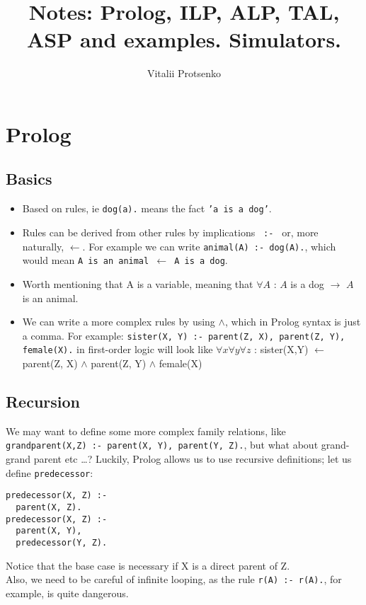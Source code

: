\documentclass[11pt]{article}
\begin{document}
\title{Notes: Prolog, ILP, ALP, TAL, ASP and examples. Simulators.}

\author{Vitalii Protsenko}

\date{}

\maketitle

\section{Prolog}

\subsection{Basics}

\begin{itemize}
  \item Based on rules, ie \texttt{dog(a).} means the fact \texttt{'a is a dog'}.
  \item Rules can be derived from other rules by implications \texttt{ :- } or, more naturally,  $\leftarrow$. For example we can write \texttt{animal(A) :- dog(A).}, which would mean \texttt{A is an animal $\leftarrow$ A is a dog}.
  \item Worth mentioning that A is a variable, meaning that $\forall A$ : $A$ is a dog $\rightarrow$ $A$ is an animal.
  \item We can write a more complex rules by using $\wedge$, which in Prolog syntax is just a comma. For example: \texttt{sister(X, Y) :- parent(Z, X), parent(Z, Y), female(X).} in first-order logic will look like $\forall x \forall y \forall z$ : sister(X,Y) $\leftarrow$ parent(Z, X) $\wedge$ parent(Z, Y) $\wedge$ female(X)
\end{itemize}

\subsection{Recursion}
We may want to define some more complex family relations, like \texttt{grandparent(X,Z) :- parent(X, Y), parent(Y, Z).}, but what about grand-grand parent etc \ldots ? Luckily, Prolog allows us to use recursive definitions; let us define \texttt{predecessor}:
\begin{lstlisting}
predecessor(X, Z) :-
  parent(X, Z).
predecessor(X, Z) :-
  parent(X, Y),
  predecessor(Y, Z).
\end{lstlisting}
Notice that the base case is necessary if X is a direct parent of Z.\\Also, we need to be careful of infinite looping, as the rule \texttt{r(A) :- r(A).}, for example, is quite dangerous.
\end{document}
